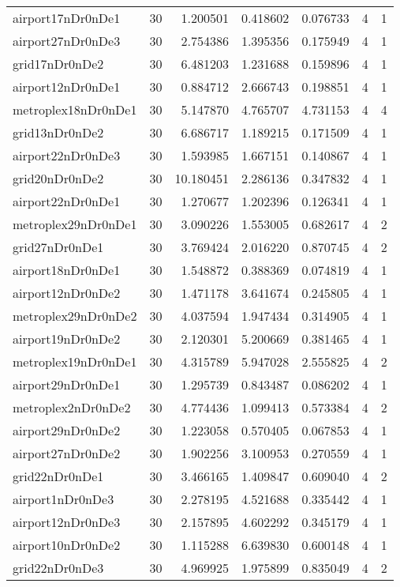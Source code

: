 \documentclass[../../../thesis.tex]{subfiles}
\begin{document}
\begin{longtable}{|l|r|r|r|r|r|r|}
airport17nDr0nDe1 & 30 & 1.200501 & 0.418602 & 0.076733 & 4 & 1 \\
airport27nDr0nDe3 & 30 & 2.754386 & 1.395356 & 0.175949 & 4 & 1 \\
grid17nDr0nDe2 & 30 & 6.481203 & 1.231688 & 0.159896 & 4 & 1 \\
airport12nDr0nDe1 & 30 & 0.884712 & 2.666743 & 0.198851 & 4 & 1 \\
metroplex18nDr0nDe1 & 30 & 5.147870 & 4.765707 & 4.731153 & 4 & 4 \\
grid13nDr0nDe2 & 30 & 6.686717 & 1.189215 & 0.171509 & 4 & 1 \\
airport22nDr0nDe3 & 30 & 1.593985 & 1.667151 & 0.140867 & 4 & 1 \\
grid20nDr0nDe2 & 30 & 10.180451 & 2.286136 & 0.347832 & 4 & 1 \\
airport22nDr0nDe1 & 30 & 1.270677 & 1.202396 & 0.126341 & 4 & 1 \\
metroplex29nDr0nDe1 & 30 & 3.090226 & 1.553005 & 0.682617 & 4 & 2 \\
grid27nDr0nDe1 & 30 & 3.769424 & 2.016220 & 0.870745 & 4 & 2 \\
airport18nDr0nDe1 & 30 & 1.548872 & 0.388369 & 0.074819 & 4 & 1 \\
airport12nDr0nDe2 & 30 & 1.471178 & 3.641674 & 0.245805 & 4 & 1 \\
metroplex29nDr0nDe2 & 30 & 4.037594 & 1.947434 & 0.314905 & 4 & 1 \\
airport19nDr0nDe2 & 30 & 2.120301 & 5.200669 & 0.381465 & 4 & 1 \\
metroplex19nDr0nDe1 & 30 & 4.315789 & 5.947028 & 2.555825 & 4 & 2 \\
airport29nDr0nDe1 & 30 & 1.295739 & 0.843487 & 0.086202 & 4 & 1 \\
metroplex2nDr0nDe2 & 30 & 4.774436 & 1.099413 & 0.573384 & 4 & 2 \\
airport29nDr0nDe2 & 30 & 1.223058 & 0.570405 & 0.067853 & 4 & 1 \\
airport27nDr0nDe2 & 30 & 1.902256 & 3.100953 & 0.270559 & 4 & 1 \\
grid22nDr0nDe1 & 30 & 3.466165 & 1.409847 & 0.609040 & 4 & 2 \\
airport1nDr0nDe3 & 30 & 2.278195 & 4.521688 & 0.335442 & 4 & 1 \\
airport12nDr0nDe3 & 30 & 2.157895 & 4.602292 & 0.345179 & 4 & 1 \\
airport10nDr0nDe2 & 30 & 1.115288 & 6.639830 & 0.600148 & 4 & 1 \\
grid22nDr0nDe3 & 30 & 4.969925 & 1.975899 & 0.835049 & 4 & 2 \\

\end{longtable}
\end{document}

